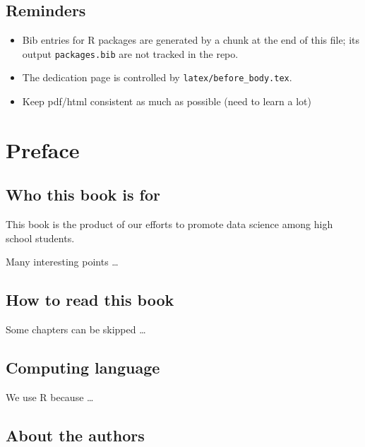 \hypertarget{reminders}{%
\section*{Reminders}\label{reminders}}

\begin{itemize}
\tightlist
\item
  Bib entries for R packages are generated by a chunk at the end of this file;
  its output \texttt{packages.bib} are not tracked in the repo.
\item
  The dedication page is controlled by \texttt{latex/before\_body.tex}.
\item
  Keep pdf/html consistent as much as possible (need to learn a lot)
\end{itemize}

\hypertarget{preface}{%
\chapter*{Preface}\label{preface}}


\hypertarget{who-this-book-is-for}{%
\section*{Who this book is for}\label{who-this-book-is-for}}


This book is the product of our efforts to promote data science among
high school students.

Many interesting points \ldots{}

\hypertarget{how-to-read-this-book}{%
\section*{How to read this book}\label{how-to-read-this-book}}


Some chapters can be skipped \ldots{}

\hypertarget{computing-language}{%
\section*{Computing language}\label{computing-language}}


We use R because \ldots{}

\hypertarget{about-the-authors}{%
\section*{About the authors}\label{about-the-authors}}


